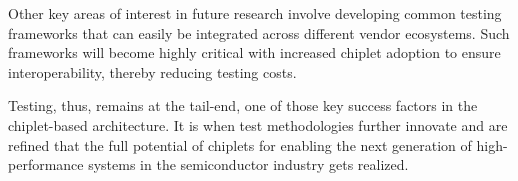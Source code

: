 \documentclass[acmtog, 12pt]{acmart}
\begin{document}
Other key areas of interest in future research involve developing common testing frameworks that can easily be integrated across different vendor ecosystems. Such frameworks will become highly critical with increased chiplet adoption to ensure interoperability, thereby reducing testing costs.

Testing, thus, remains at the tail-end, one of those key success factors in the chiplet-based architecture. It is when test methodologies further innovate and are refined that the full potential of chiplets for enabling the next generation of high-performance systems in the semiconductor industry gets realized.



\end{document}
